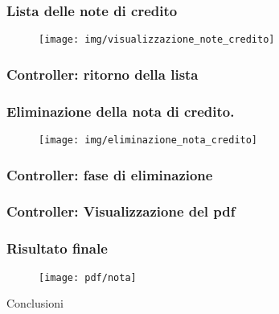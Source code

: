 \documentclass[]{beamer}
\begin{document}
    \begin{frame}
        \frametitle{Lista delle note di credito}
        \begin{figure}[H]
            \centering
            \texttt{[image: img/visualizzazione\_note\_credito]}\label{fig:visualizzazione}
        \end{figure}
    \end{frame}

    \begin{frame}
        \frametitle{Controller: ritorno della lista}
        
    \end{frame}

    \begin{frame}
        \frametitle{Eliminazione della nota di credito.}
        \begin{figure}[H]
            \centering
            \texttt{[image: img/eliminazione\_nota\_credito]}\label{fig:eliminazione}
        \end{figure}
    \end{frame}

    \begin{frame}
        \frametitle{Controller: fase di eliminazione}
        
    \end{frame}

    \begin{frame}
        \frametitle{Controller: Visualizzazione del pdf}
        
    \end{frame}

    \begin{frame}
        \frametitle{Risultato finale}
        \begin{figure}[H]
            \texttt{[image: pdf/nota]}\label{fig:nota}
        \end{figure}
    \end{frame}

    \begin{frame}
        \begin{center}          
            \huge Conclusioni
        \end{center}
    \end{frame}
\end{document}
